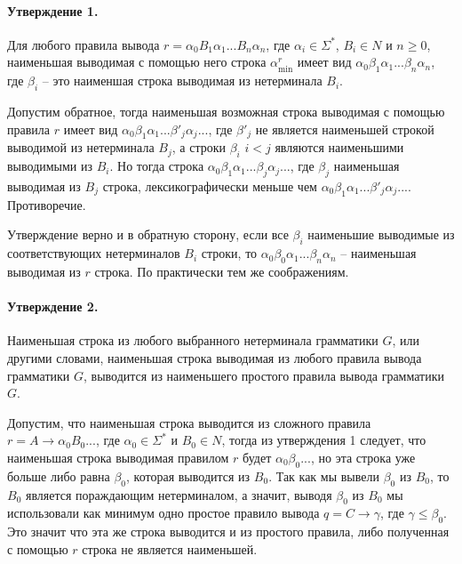 \documentclass[12pt]{article}
\begin{document}
\paragraph{Утверждение 1.} Для любого правила вывода
$ r = \alpha_0 B_1 \alpha_1 ... B_n \alpha_n $, где
$ \alpha_i \in \Sigma^*$, $ B_i \in N $ и $ n \ge 0 $, наименьшая
выводимая с помощью него строка $ \alpha_{\min}^r $ имеет вид
$ \alpha_0 \beta_1 \alpha_1 ... \beta_n \alpha_n $, где
$ \beta_i $ -- это наименшая строка выводимая из нетерминала $ B_i $.

Допустим обратное, тогда наименьшая возможная строка выводимая с
помощью правила $ r $ имеет вид
$ \alpha_0 \beta_1 \alpha_1 ... \beta'_j \alpha_j ... $, где $ \beta'_j $
не является наименьшей строкой выводимой из нетерминала $ B_j $, а строки
$ \beta_i $ $ i < j $ являются наименьшими выводимыми из $ B_i $.
Но тогда
строка $ \alpha_0 \beta_1 \alpha_1 ... \beta_j \alpha_j ... $, где
$ \beta_j $ наименьшая выводимая из $ B_j $ строка, лексикографически меньше
чем $ \alpha_0 \beta_1 \alpha_1 ... \beta'_j \alpha_j ... $. Противоречие.

Утверждение верно и в обратную сторону, если все $ \beta_i $ наименьшие
выводимые из соответствующих нетерминалов $ B_i $ строки, то
$ \alpha_0 \beta_0 \alpha_1 ... \beta_n \alpha_n $ -- наименьшая выводимая
из $ r $ строка. По практически тем же соображениям.

\paragraph{Утверждение 2.} Наименьшая строка из любого выбранного
нетерминала грамматики $ G $, или другими словами, наименьшая строка
выводимая из любого правила вывода грамматики $ G $, выводится из
наименьшего простого правила вывода грамматики $ G $.

Допустим, что наименьшая строка выводится из сложного правила
$ r = A \rightarrow \alpha_0 B_0 ... $, где $ \alpha_0 \in \Sigma^* $ и
$ B_0 \in N $, тогда из утверждения 1 следует, что наименьшая строка
выводимая правилом $ r $ будет $ \alpha_0 \beta_0 ... $, но эта строка
уже больше либо равна $ \beta_0 $, которая выводится из $ B_0 $. Так как
мы вывели $ \beta_0 $ из $ B_0 $, то $ B_0 $ является пораждающим
нетерминалом, а значит, выводя $ \beta_0 $ из $ B_0 $ мы использовали
как минимум одно простое правило вывода $ q = C \rightarrow \gamma $,
где $ \gamma \le \beta_0 $. Это значит что эта же строка выводится и
из простого правила, либо полученная с помощью $ r $ строка не является
наименьшей.
\end{document}
